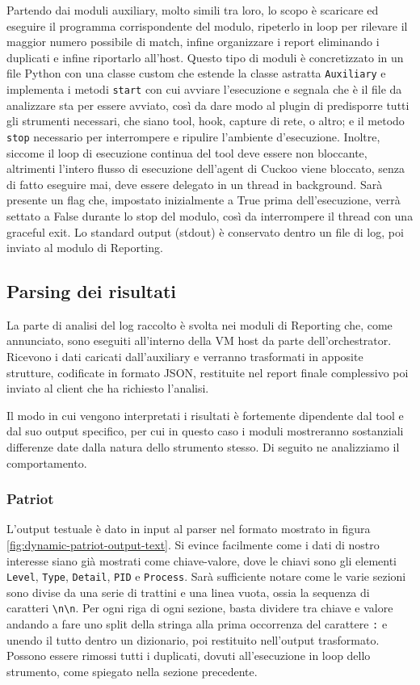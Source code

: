 Partendo dai moduli auxiliary, molto simili tra loro, lo scopo è scaricare ed eseguire il programma corrispondente del modulo, ripeterlo in loop per rilevare il maggior numero possibile di match, infine organizzare i report eliminando i duplicati e infine riportarlo all'host.
Questo tipo di moduli è concretizzato in un file Python con una classe custom che estende la classe astratta \texttt{Auxiliary} e implementa i metodi \texttt{start} con cui avviare l'esecuzione e segnala che è il file da analizzare sta per essere avviato, così da dare modo al plugin di predisporre tutti gli strumenti necessari, che siano tool, hook, capture di rete, o altro; e il metodo \texttt{stop} necessario per interrompere e ripulire l'ambiente d'esecuzione.
Inoltre, siccome il loop di esecuzione continua del tool deve essere non bloccante, altrimenti l'intero flusso di esecuzione dell'agent di Cuckoo viene bloccato, senza di fatto eseguire mai, deve essere delegato in un thread in background.
Sarà presente un flag che, impostato inizialmente a True prima dell'esecuzione, verrà settato a False durante lo stop del modulo, così da interrompere il thread con una graceful exit.
Lo standard output (stdout) è conservato dentro un file di log, poi inviato al modulo di Reporting.

\subsection{Parsing dei risultati}
La parte di analisi del log raccolto è svolta nei moduli di Reporting che, come annunciato, sono eseguiti all'interno della VM host da parte dell'orchestrator.
Ricevono i dati caricati dall'auxiliary e verranno trasformati in apposite strutture, codificate in formato JSON, restituite nel report finale complessivo poi inviato al client che ha richiesto l'analisi.

Il modo in cui vengono interpretati i risultati è fortemente dipendente dal tool e dal suo output specifico, per cui in questo caso i moduli mostreranno sostanziali differenze date dalla natura dello strumento stesso.
Di seguito ne analizziamo il comportamento.

\subsubsection{Patriot}
L'output testuale è dato in input al parser nel formato mostrato in figura \ref{fig:dynamic-patriot-output-text}.
Si evince facilmente come i dati di nostro interesse siano già mostrati come chiave-valore, dove le chiavi sono gli elementi \texttt{Level}, \texttt{Type}, \texttt{Detail}, \texttt{PID} e \texttt{Process}.
Sarà sufficiente notare come le varie sezioni sono divise da una serie di trattini e una linea vuota, ossia la sequenza di caratteri \texttt{\textbackslash{}n\textbackslash{}n}. Per ogni riga di ogni sezione, basta dividere tra chiave e valore andando a fare uno split della stringa alla prima occorrenza del carattere \texttt{:} e unendo il tutto dentro un dizionario, poi restituito nell'output trasformato.
Possono essere rimossi tutti i duplicati, dovuti all'esecuzione in loop dello strumento, come spiegato nella sezione precedente.

